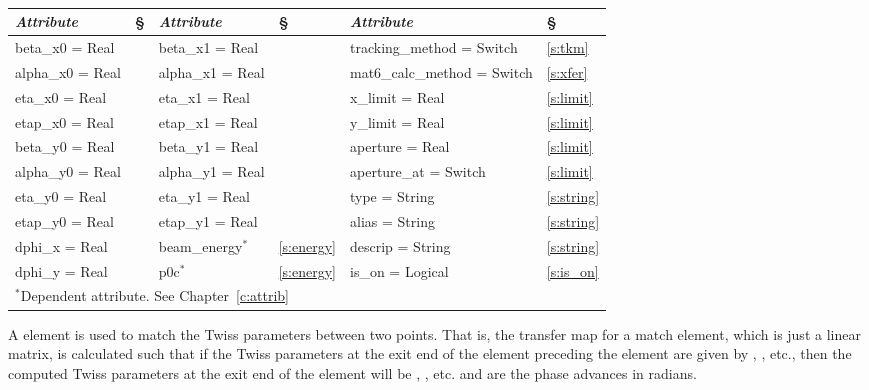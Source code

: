 {{\begin{center}
\tt
\begin{tabular}{|l|l||l|l||l|l|} \hline
  {\sl Attribute} & \S  & {\sl Attribute} & \S & {\sl Attribute} & \S \\ \hline
  beta\_x0  = Real &               & beta\_x1  = Real &                & tracking\_method = Switch   & \ref{s:tkm}    \\ \hline
  alpha\_x0 = Real &               & alpha\_x1 = Real &                & mat6\_calc\_method = Switch & \ref{s:xfer}   \\ \hline
  eta\_x0   = Real &               & eta\_x1   = Real &                & x\_limit = Real             & \ref{s:limit}  \\ \hline
  etap\_x0  = Real &               & etap\_x1  = Real &                & y\_limit = Real             & \ref{s:limit}  \\ \hline
  beta\_y0  = Real &               & beta\_y1  = Real &                & aperture = Real             & \ref{s:limit}  \\ \hline
  alpha\_y0 = Real &               & alpha\_y1 = Real &                & aperture\_at = Switch       & \ref{s:limit}  \\ \hline
  eta\_y0   = Real &               & eta\_y1   = Real &                & type = String               & \ref{s:string} \\ \hline
  etap\_y0  = Real &               & etap\_y1  = Real &                & alias = String              & \ref{s:string} \\ \hline
  dphi\_x   = Real &               & beam\_energy$^*$ & \ref{s:energy} & descrip = String            & \ref{s:string} \\ \hline
  dphi\_y   = Real &               & p0c$^*$          & \ref{s:energy} & is\_on = Logical            & \ref{s:is_on}  \\ \hline
  \multicolumn{6}{l}{\small $^*$Dependent attribute. See Chapter~\ref{c:attrib}} \\
\end{tabular}
\end{center}
\toffset

A  element is used to match the Twiss parameters between two points. That is, 
the transfer map for a match element, which is just a linear matrix, is calculated such that
if the Twiss parameters at the exit end of the element preceding the  element are 
given by , , etc., then the computed Twiss parameters at the exit
end of the  element will be , , etc.  and 
are the phase advances in radians.

}}
